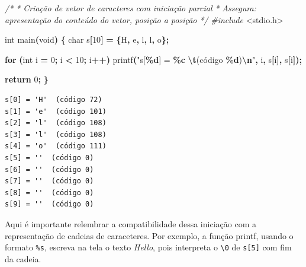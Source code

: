 \documentclass[
  11pt,
  a4paper,
]{scrbook}
\newenvironment{Shaded}{\begin{snugshade}}{\end{snugshade}}
\newcommand{\CharTok}[1]{\textcolor[rgb]{0.31,0.60,0.02}{#1}}
\newcommand{\CommentTok}[1]{\textcolor[rgb]{0.56,0.35,0.01}{\textit{#1}}}
\newcommand{\ControlFlowTok}[1]{\textcolor[rgb]{0.13,0.29,0.53}{\textbf{#1}}}
\newcommand{\DataTypeTok}[1]{\textcolor[rgb]{0.13,0.29,0.53}{#1}}
\newcommand{\DecValTok}[1]{\textcolor[rgb]{0.00,0.00,0.81}{#1}}
\newcommand{\ImportTok}[1]{#1}
\newcommand{\NormalTok}[1]{#1}
\newcommand{\OperatorTok}[1]{\textcolor[rgb]{0.81,0.36,0.00}{\textbf{#1}}}
\newcommand{\PreprocessorTok}[1]{\textcolor[rgb]{0.56,0.35,0.01}{\textit{#1}}}
\newcommand{\SpecialCharTok}[1]{\textcolor[rgb]{0.81,0.36,0.00}{\textbf{#1}}}
\newcommand{\StringTok}[1]{\textcolor[rgb]{0.31,0.60,0.02}{#1}}
\begin{document}
\begin{Shaded}
\begin{Highlighting}[]
\CommentTok{/*}
\CommentTok{ * Criação de vetor de caracteres com iniciação parcial}
\CommentTok{ * Assegura: apresentação do conteúdo do vetor, posição a posição}
\CommentTok{ */}
\PreprocessorTok{\#include }\ImportTok{\textless{}stdio.h\textgreater{}}

\DataTypeTok{int}\NormalTok{ main}\OperatorTok{(}\DataTypeTok{void}\OperatorTok{)} \OperatorTok{\{}
    \DataTypeTok{char}\NormalTok{ s}\OperatorTok{[}\DecValTok{10}\OperatorTok{]} \OperatorTok{=} \OperatorTok{\{}\CharTok{\textquotesingle{}H\textquotesingle{}}\OperatorTok{,} \CharTok{\textquotesingle{}e\textquotesingle{}}\OperatorTok{,} \CharTok{\textquotesingle{}l\textquotesingle{}}\OperatorTok{,} \CharTok{\textquotesingle{}l\textquotesingle{}}\OperatorTok{,} \CharTok{\textquotesingle{}o\textquotesingle{}}\OperatorTok{\};}

    \ControlFlowTok{for} \OperatorTok{(}\DataTypeTok{int}\NormalTok{ i }\OperatorTok{=} \DecValTok{0}\OperatorTok{;}\NormalTok{ i }\OperatorTok{\textless{}} \DecValTok{10}\OperatorTok{;}\NormalTok{ i}\OperatorTok{++)}
\NormalTok{        printf}\OperatorTok{(}\StringTok{"s[}\SpecialCharTok{\%d}\StringTok{] = \textquotesingle{}}\SpecialCharTok{\%c}\StringTok{\textquotesingle{} }\SpecialCharTok{\textbackslash{}t}\StringTok{(código }\SpecialCharTok{\%d}\StringTok{)}\SpecialCharTok{\textbackslash{}n}\StringTok{"}\OperatorTok{,}\NormalTok{ i}\OperatorTok{,}\NormalTok{ s}\OperatorTok{[}\NormalTok{i}\OperatorTok{],}\NormalTok{ s}\OperatorTok{[}\NormalTok{i}\OperatorTok{]);}

    \ControlFlowTok{return} \DecValTok{0}\OperatorTok{;}
\OperatorTok{\}}
\end{Highlighting}
\end{Shaded}

\begin{verbatim}
s[0] = 'H' 	(código 72)
s[1] = 'e' 	(código 101)
s[2] = 'l' 	(código 108)
s[3] = 'l' 	(código 108)
s[4] = 'o' 	(código 111)
s[5] = ' ' 	(código 0)
s[6] = ' ' 	(código 0)
s[7] = ' ' 	(código 0)
s[8] = ' ' 	(código 0)
s[9] = ' ' 	(código 0)
\end{verbatim}

Aqui é importante relembrar a compatibilidade dessa iniciação com a
representação de cadeias de caraceteres. Por exemplo, a função printf,
usando o formato \texttt{\%s}, escreva na tela o texto \emph{Hello},
pois interpreta o \texttt{\textbackslash{}0} de \texttt{s{[}5{]}} com
fim da cadeia.
\end{document}
